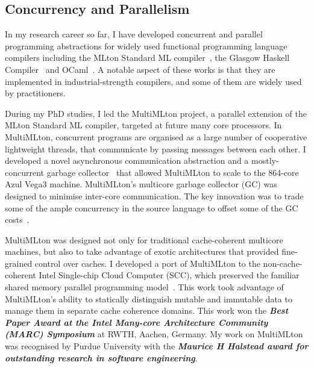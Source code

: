 \documentclass[screen,acmsmall,nonacm]{acmart}
\newcommand{\loud}[1]{\textbf{\textit{#1}}}
\begin{document}
\subsection{Concurrency and Parallelism}

In my research career so far, I have developed concurrent and parallel
programming abstractions for widely used functional programming language
compilers including the MLton Standard ML compiler~\cite{mmpar, mmgc,
KC_MARC12, Ziarek11, Ziarek09, MMJFP}, the Glasgow Haskell
Compiler~\cite{CompSA} and OCaml~\cite{RetroEffects,RetroParallel}. A notable
aspect of these works is that they are implemented in industrial-strength
compilers, and some of them are widely used by practitioners.

During my PhD studies, I led the MultiMLton project, a parallel extension of
the MLton Standard ML compiler, targeted at future many core processors. In
MultiMLton, concurrent programs are organised as a large number of cooperative
lightweight threads, that communicate by passing messages between each other. I
developed a novel asynchronous communication abstraction and a
mostly-concurrent garbage collector~\cite{MMJFP} that allowed MultiMLton to
scale to the 864-core Azul Vega3 machine. MultiMLton's multicore garbage
collector (GC) was designed to minimise inter-core communication. The key
innovation was to trade some of the ample concurrency in the source language to
offset some of the GC costs~\cite{mmgc}.

MultiMLton was designed not only for traditional cache-coherent multicore
machines, but also to take advantage of exotic architectures that provided
fine-grained control over caches. I developed a port of MultiMLton to the
non-cache-coherent Intel Single-chip Cloud Computer (SCC), which preserved the
familiar shared memory parallel programming model~\cite{KC_MARC12}. This work
took advantage of MultiMLton's ability to statically distinguish mutable and
immutable data to manage them in separate cache coherence domains. This work
won the \loud{Best Paper Award at the Intel Many-core Architecture Community
(MARC) Symposium} at RWTH, Aachen, Germany. My work on MultiMLton was
recognised by Purdue University with the \loud{Maurice H Halstead award for
outstanding research in software engineering}.
\end{document}
